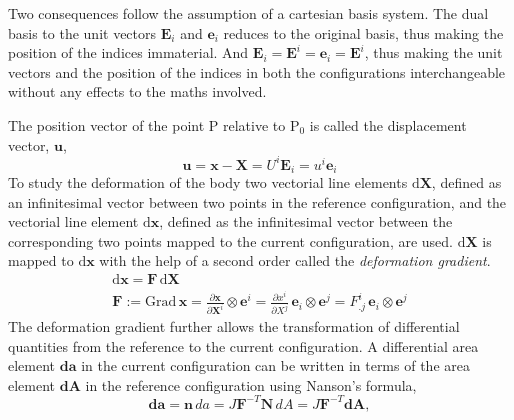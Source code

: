 \documentclass[../main.tex]{subfiles}
\begin{document}
Two consequences follow the assumption of a cartesian basis system. The dual basis to the unit vectors $\boldsymbol{{E}}_{{i}}$ and $\boldsymbol{{e}}_{{i}}$
 reduces to the original basis, thus making the position of the indices immaterial. And
 $\boldsymbol{{E}}_{{i}} = \boldsymbol{{E}}^{{i}} = \boldsymbol{{e}}_{{i}} = \boldsymbol{{E}}^{{i}}$, thus making the unit
 vectors and the position of the indices in both the configurations interchangeable without any effects to the maths involved.

The position vector of the point P relative to $\mathrm{P}_{0}$ is called the displacement vector, $\boldsymbol{{u}}$,
\begin{equation} \label{displacement_vector}
    \boldsymbol{{u}} = \boldsymbol{{x}} - \boldsymbol{{X}} = {U}^{{i}} \boldsymbol{{E}}_{{i}} = {u}^{{i}} \boldsymbol{{e}}_{{i}}
\end{equation}
To study the deformation of the body two vectorial line elements $\mathrm{d}\boldsymbol{X}$,
 defined as an infinitesimal vector between two points in the reference configuration, 
 and the vectorial line element $\mathrm{d\boldsymbol{x}}$, defined as the infinitesimal vector between the corresponding two points mapped to the current
 configuration, are used. $\mathrm{d\boldsymbol{X}}$ is mapped to $\mathrm{d\boldsymbol{x}}$ with the help of a second order
 called the \emph{deformation gradient}.
 \begin{gather} \label{deformation_gradient}
    \mathrm{d}\boldsymbol{x} = \boldsymbol{{F}} \, \mathrm{d}\boldsymbol{X} \\
    \boldsymbol{{F}} := \mathrm{Grad} \, \boldsymbol{{x}} = \frac{\partial \boldsymbol{{x}}}{\partial \boldsymbol{{X}}^{{i}}} \otimes \boldsymbol{{e}}^{{i}} = \frac{\partial{x}^{i}}{\partial {X}^{{j}}} \, \boldsymbol{{e}}_{{i}} \otimes \boldsymbol{{e}}^{{j}} = {F}^{{i}}_{.j} \, \boldsymbol{e}_{i} \otimes \boldsymbol{e}^{j} 
\end{gather}
The deformation gradient further allows the transformation of differential quantities from the reference to the current configuration.
 A differential area element $\mathbf{da}$ in the current configuration can be written in terms of the area element $\mathbf{dA}$ in the reference configuration
 using Nanson's formula,
 \begin{equation} \label{Nansons}
    \mathbf{d}\boldsymbol{a} = \mathbf{n} \,da = J \boldsymbol{F}^{-T} \boldsymbol{N} \,dA = J \boldsymbol{F}^{-T} \mathbf{d}\boldsymbol{A},
 \end{equation}
\end{document}

